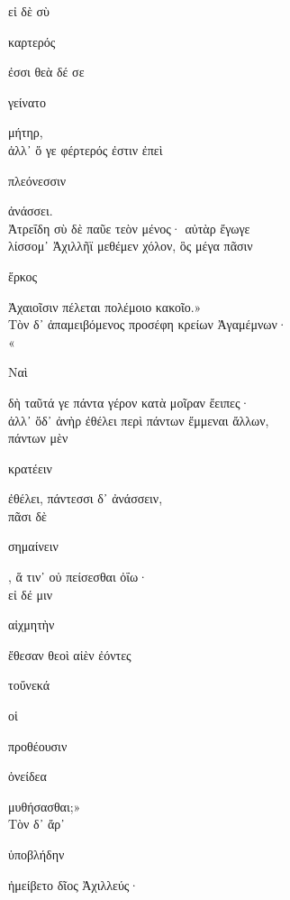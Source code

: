 \documentclass{ransom}
\begin{document}
\renewcommand{\rightheaderwhat}{\rightheaderwhatglosses}%
\begin{foreignpage}
\begin{graytext}
εἰ δὲ σὺ \begin{whitetext}καρτερός\end{whitetext} ἐσσι θεὰ δέ σε \begin{whitetext}γείνατο\end{whitetext} μήτηρ,\hfill{}\\
ἀλλ᾽ ὅ γε φέρτερός ἐστιν ἐπεὶ \begin{whitetext}πλεόνεσσιν\end{whitetext} ἀνάσσει.\\
Ἀτρεΐδη σὺ δὲ παῦε τεὸν μένος· αὐτὰρ ἔγωγε\\
λίσσομ᾽ Ἀχιλλῆϊ μεθέμεν χόλον, ὃς μέγα πᾶσιν\\
\begin{whitetext}ἕρκος\end{whitetext} Ἀχαιοῖσιν πέλεται πολέμοιο κακοῖο.»\\
Τὸν δ᾽ ἀπαμειβόμενος προσέφη κρείων Ἀγαμέμνων·\hfill{}\\
«\begin{whitetext}Ναὶ\end{whitetext} δὴ ταῦτά γε πάντα γέρον κατὰ μοῖραν ἔειπες·\\
ἀλλ᾽ ὅδ᾽ ἀνὴρ ἐθέλει περὶ πάντων ἔμμεναι ἄλλων,\\
πάντων μὲν \begin{whitetext}κρατέειν\end{whitetext} ἐθέλει, πάντεσσι δ᾽ ἀνάσσειν,\\
πᾶσι δὲ \begin{whitetext}σημαίνειν\end{whitetext}, ἅ τιν᾽ οὐ πείσεσθαι ὀΐω·\\
εἰ δέ μιν \begin{whitetext}αἰχμητὴν\end{whitetext} ἔθεσαν θεοὶ αἰὲν ἐόντες\hfill{}\\
\begin{whitetext}τοὔνεκά\end{whitetext} οἱ \begin{whitetext}προθέουσιν\end{whitetext} \begin{whitetext}ὀνείδεα\end{whitetext} μυθήσασθαι;»\\
Τὸν δ᾽ ἄρ᾽ \begin{whitetext}ὑποβλήδην\end{whitetext} ἠμείβετο δῖος Ἀχιλλεύς·\\

\end{graytext}
\end{foreignpage}
\end{document}
